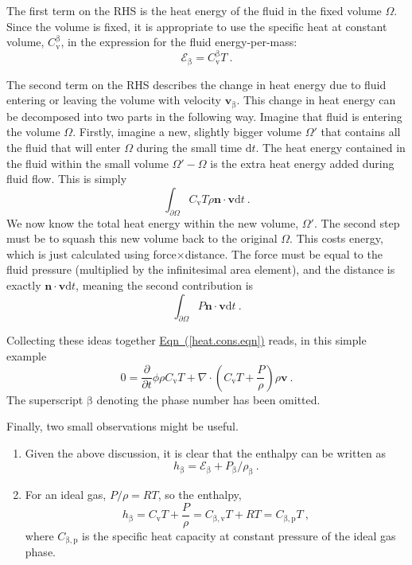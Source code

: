 \documentclass[12pt]{report}
\def\phase{\mathrm{\beta}}
\def\darcyvel{\mathbf{v}}
\def\energydens{\mathcal{E}}
\def\d{\mathrm{d}}
\begin{document}
The first term on the RHS is the heat energy of the fluid in the fixed
volume $\Omega$.  Since the volume is fixed, it is appropriate to use
the specific heat at constant volume, $C_{\mathrm{v}}^{\phase}$, in
the expression for the fluid energy-per-mass:
\begin{equation}
\energydens_{\phase} = C_{\mathrm{v}}^{\phase}T \ .
\end{equation}

The second term on the RHS describes the change in heat energy due to
fluid entering or leaving the volume with velocity
$\darcyvel_{\phase}$.  This change in heat energy can be decomposed
into two parts in the following way.  Imagine that fluid is entering
the volume $\Omega$.  Firstly, imagine a new, slightly bigger volume
$\Omega'$ that contains all the fluid that will enter $\Omega$ during
the small time $\d t$.  The heat energy contained in the fluid within
the small volume $\Omega' - \Omega$ is the extra heat energy added
during fluid flow.  This is simply
\begin{equation}
\int_{\partial\Omega} C_{\mathrm{v}}T \rho {\mathbf n}\cdot \darcyvel
\d t
\ .
\end{equation}
We now know the total heat energy within the new volume, $\Omega'$.
The second step must be to squash this new volume back to the original
$\Omega$.  This costs energy, which is just calculated using
force$\times$distance.  The force must be equal to the fluid pressure
(multiplied by the infinitesimal area element), and the distance is
exactly ${\mathbf n}\cdot \darcyvel \d t$, meaning the second
contribution is
\begin{equation}
\int_{\partial\Omega} P{\mathbf n}\cdot \darcyvel \d t \ .
\end{equation}

Collecting these ideas together
\hyperref[heat.cons.eqn]{Eqn~(\ref*{heat.cons.eqn})} reads, in this
simple example
\begin{equation}
0 = \frac{\partial}{\partial t}\phi \rho C_{\mathrm{v}} T +
\nabla\cdot \left(C_{\mathrm{v}}T + \frac{P}{\rho} \right) \rho \darcyvel
\ .
\end{equation}
The superscript $\phase$ denoting the phase number has been omitted.

Finally, two small observations might be useful.
\begin{enumerate}
\item Given the above discussion, it is clear that
  the enthalpy can be written as
\begin{equation}
h_{\phase} = \energydens_{\phase} + P_{\phase}/\rho_{\phase} \ .
\end{equation}
\item For an ideal gas, $P/\rho =
RT$, so the enthalpy,
\begin{equation}
h_{\phase} = C_{\mathrm{v}}T + \frac{P}{\rho} = C_{\phase ,\mathrm{v}}T + RT =
  C_{\phase ,\mathrm{p}}T \ ,
\end{equation}
where $C_{\phase , \mathrm{p}}$ is the specific heat capacity at constant
pressure of the ideal gas phase.
\end{enumerate}
\end{document}
